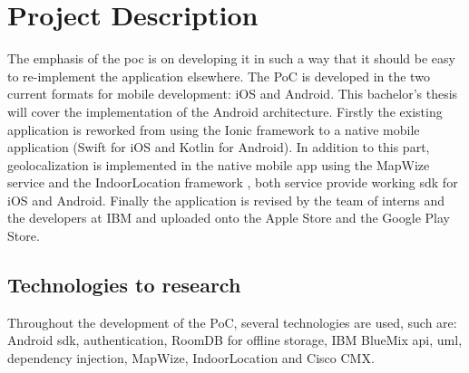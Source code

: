 \section{Project Description}
The emphasis of the \acrshort{poc} is on developing it in such a way that it should be easy to re-implement the application elsewhere. The PoC is developed in the two current formats for mobile development: iOS and Android. This bachelor's thesis will cover the implementation of the Android architecture. Firstly the existing application is reworked from using the Ionic framework to a native mobile application (Swift for iOS and Kotlin for Android). In addition to this part, geolocalization is implemented in the native mobile app using the MapWize service \cite{MapWize.io2019} and the IndoorLocation framework \cite{IndoorLocation.io2019}, both service provide working \acrfull{sdk} for iOS and Android. Finally the application is revised by the team of interns and the developers at IBM and uploaded onto the Apple Store and the Google Play Store.
\subsection{Technologies to research}
Throughout the development of the PoC, several technologies are used, such are: Android \acrshort{sdk}, authentication, RoomDB for offline storage, IBM BlueMix \acrshort{api}, \acrfull{uml}, dependency injection, MapWize, IndoorLocation and Cisco CMX.